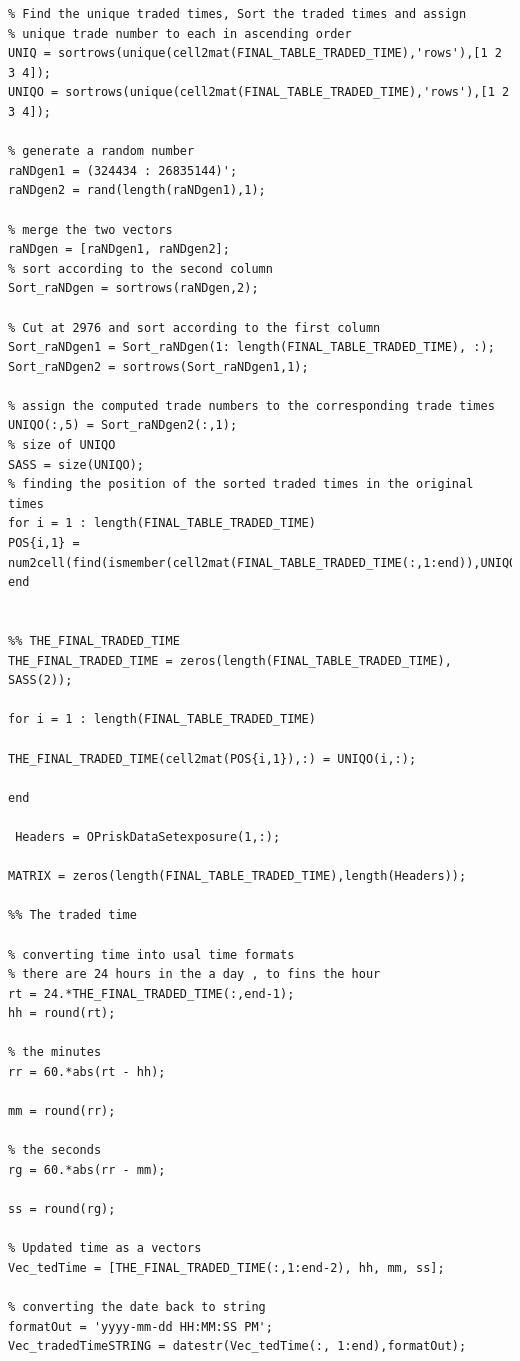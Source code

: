 \documentclass{DissertateUSU}
\begin{document}
\begin{verbatim}
% Find the unique traded times, Sort the traded times and assign
% unique trade number to each in ascending order
UNIQ = sortrows(unique(cell2mat(FINAL_TABLE_TRADED_TIME),'rows'),[1 2 3 4]);
UNIQO = sortrows(unique(cell2mat(FINAL_TABLE_TRADED_TIME),'rows'),[1 2 3 4]);

% generate a random number
raNDgen1 = (324434 : 26835144)';
raNDgen2 = rand(length(raNDgen1),1);

% merge the two vectors
raNDgen = [raNDgen1, raNDgen2];
% sort according to the second column
Sort_raNDgen = sortrows(raNDgen,2);

% Cut at 2976 and sort according to the first column
Sort_raNDgen1 = Sort_raNDgen(1: length(FINAL_TABLE_TRADED_TIME), :);
Sort_raNDgen2 = sortrows(Sort_raNDgen1,1);

% assign the computed trade numbers to the corresponding trade times
UNIQO(:,5) = Sort_raNDgen2(:,1);
% size of UNIQO
SASS = size(UNIQO);
% finding the position of the sorted traded times in the original times
for i = 1 : length(FINAL_TABLE_TRADED_TIME)
POS{i,1} = num2cell(find(ismember(cell2mat(FINAL_TABLE_TRADED_TIME(:,1:end)),UNIQO(i,1:4),'rows')~=0));
end


%% THE_FINAL_TRADED_TIME
THE_FINAL_TRADED_TIME = zeros(length(FINAL_TABLE_TRADED_TIME), SASS(2));

for i = 1 : length(FINAL_TABLE_TRADED_TIME)
    
THE_FINAL_TRADED_TIME(cell2mat(POS{i,1}),:) = UNIQO(i,:);   
       
end

 Headers = OPriskDataSetexposure(1,:);

MATRIX = zeros(length(FINAL_TABLE_TRADED_TIME),length(Headers));

%% The traded time

% converting time into usal time formats
% there are 24 hours in the a day , to fins the hour
rt = 24.*THE_FINAL_TRADED_TIME(:,end-1);
hh = round(rt);

% the minutes
rr = 60.*abs(rt - hh);

mm = round(rr);

% the seconds
rg = 60.*abs(rr - mm);

ss = round(rg);

% Updated time as a vectors
Vec_tedTime = [THE_FINAL_TRADED_TIME(:,1:end-2), hh, mm, ss];

% converting the date back to string
formatOut = 'yyyy-mm-dd HH:MM:SS PM';
Vec_tradedTimeSTRING = datestr(Vec_tedTime(:, 1:end),formatOut);


\end{verbatim}
\end{document}
